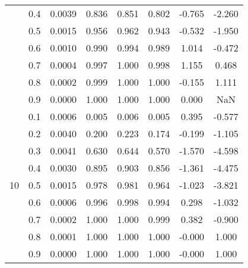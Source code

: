 \documentclass[11pt,a4paper]{report}
\begin{document}
\begin{longtable}{ | c | c || c | c | c | c | c | c | }
 & 0.4 & 0.0039 & 0.836 & 0.851 & 0.802 & -0.765 & -2.260 \\
 & 0.5 & 0.0015 & 0.956 & 0.962 & 0.943 & -0.532 & -1.950 \\
 & 0.6 & 0.0010 & 0.990 & 0.994 & 0.989 & 1.014 & -0.472 \\
 & 0.7 & 0.0004 & 0.997 & 1.000 & 0.998 & 1.155 & 0.468 \\
 & 0.8 & 0.0002 & 0.999 & 1.000 & 1.000 & -0.155 & 1.111 \\
 & 0.9 & 0.0000 & 1.000 & 1.000 & 1.000 & 0.000 & NaN \\
 \hline
\multirow{9}{*}{10} & 0.1 & 0.0006 & 0.005 & 0.006 & 0.005 & 0.395 & -0.577 \\
 & 0.2 & 0.0040 & 0.200 & 0.223 & 0.174 & -0.199 & -1.105 \\
 & 0.3 & 0.0041 & 0.630 & 0.644 & 0.570 & -1.570 & -4.598 \\
 & 0.4 & 0.0030 & 0.895 & 0.903 & 0.856 & -1.361 & -4.475 \\
 & 0.5 & 0.0015 & 0.978 & 0.981 & 0.964 & -1.023 & -3.821 \\
 & 0.6 & 0.0006 & 0.996 & 0.998 & 0.994 & 0.298 & -1.032 \\
 & 0.7 & 0.0002 & 1.000 & 1.000 & 0.999 & 0.382 & -0.900 \\
 & 0.8 & 0.0001 & 1.000 & 1.000 & 1.000 & -0.000 & 1.000 \\
 & 0.9 & 0.0000 & 1.000 & 1.000 & 1.000 & -0.000 & 1.000 \\
 \hline
\hline
\end{longtable}
\end{document}
